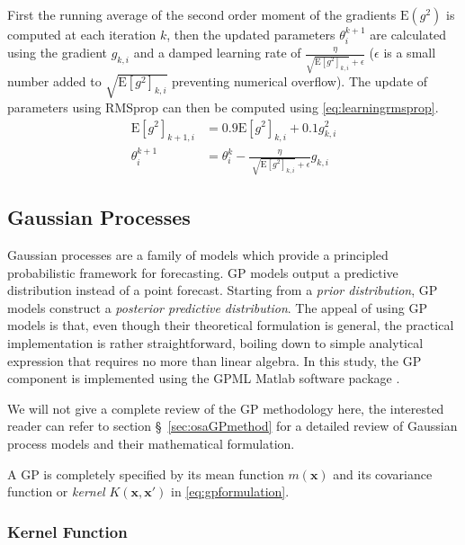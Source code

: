 First the running average of the second order moment of the gradients $\mathrm{E} \left( g^{2} \right)$ is computed at 
each iteration $k$, then the updated parameters $\theta^{k+1}_{i}$ are calculated using the gradient $g_{k,i}$ and a 
damped learning rate of $\frac{\eta}{\sqrt{\mathrm{E} \left[ g^{2} \right]_{k,i}} + \epsilon }$ ($\epsilon$ is a small 
number added to $\sqrt{\mathrm{E} \left[ g^{2} \right]_{k,i}}$ preventing numerical overflow). The update of parameters 
using RMSprop can then be computed using \cref{eq:learningrmsprop}.
%
\begin{align}\label{eq:learningrmsprop}
 \mathrm{E} \left[ g^{2} \right]_{k+1,i} &= 0.9 \mathrm{E} \left[ g^{2} \right]_{k,i} + 0.1 g_{k,i}^{2}  \\ 
 \theta^{k+1}_{i} &= \theta^{k}_{i} - \frac{ \eta }{\sqrt[]{\mathrm{E} \left[ g^{2} \right]_{k,i}} + \epsilon } g_{k,i}
\end{align}

\subsection{Gaussian Processes}\label{sec:gpcomponent}

Gaussian processes are a family of models which provide a principled probabilistic framework for forecasting.
GP models output a predictive distribution instead of a point forecast. Starting from a \emph{prior distribution},
GP models construct a \emph{posterior predictive distribution}. The appeal of using GP models is that, even though 
their theoretical formulation is general, the practical implementation is rather straightforward, boiling down to 
simple analytical expression that requires no more than linear algebra. In this study, the GP component is 
implemented using the GPML Matlab software package \citep{rasmussen2010gaussian}. 

We will not give a complete review of the GP methodology here, the interested reader can refer to 
section \S~\ref{sec:osaGPmethod} for a detailed review of Gaussian process models and their mathematical formulation.

A GP is completely specified by its mean function  $m \left( \mathbf{x} \right)$ and its covariance function 
or \emph{kernel} $K (\mathbf{x}, \mathbf{x}')$ in \cref{eq:gpformulation}.

\subsubsection*{Kernel Function}

